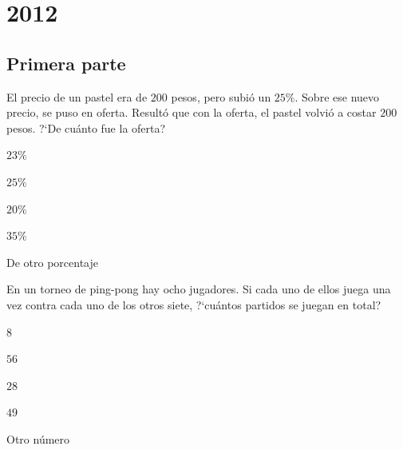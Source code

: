 \chapter{2012}
\label{cha:2012}

\section{Primera parte}
\label{sec:primera-parte}

\begin{Problema}{1}
  El precio de un pastel era de $200$ pesos, pero subi\'o un
  $25\%$. Sobre ese nuevo precio, se puso en oferta. Result\'o que con
  la oferta, el pastel volvi\'o a costar $200$ pesos. ?`De cu\'anto
  fue la oferta?

  \begin{inparaenum}
  \item $23\%$ \esp
  \item $25\%$ \esp
  \item $20\%$ \esp
  \item $35\%$ \esp
  \item De otro porcentaje
  \end{inparaenum}
\end{Problema}

\begin{Solucion}
  
\end{Solucion}

\begin{Problema}{2}
  En un torneo de ping-pong hay ocho jugadores. Si cada uno de ellos
  juega una vez contra cada uno de los otros siete, ?`cu\'antos
  partidos se juegan en total?

  \begin{inparaenum}
  \item $8$ \esp
  \item $56$ \esp
  \item $28$ \esp
  \item $49$ \esp 
  \item Otro n\'umero
  \end{inparaenum}
\end{Problema}

\begin{Solucion}
  
\end{Solucion}

